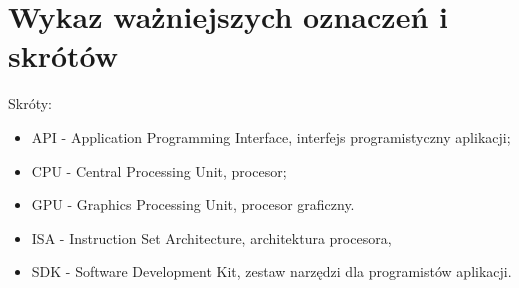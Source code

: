 \chapter*{Wykaz ważniejszych oznaczeń i skrótów}

Skróty:
\begin{itemize}
\item{API} - Application Programming Interface, interfejs programistyczny aplikacji;
\item{CPU} - Central Processing Unit, procesor;
\item{GPU} - Graphics Processing Unit, procesor graficzny.
\item{ISA} - Instruction Set Architecture, architektura procesora,
\item{SDK} - Software Development Kit, zestaw narzędzi dla programistów aplikacji.
\end{itemize}